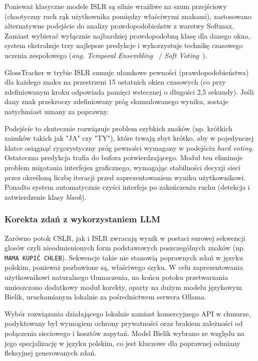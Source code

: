 \documentclass[12pt]{article}
\begin{document}
Ponieważ klasyczne modele ISLR są silnie wrażliwe na szum przejściowy (chaotyczny ruch rąk użytkownika pomiędzy właściwymi znakami), zastosowano alternatywne podejście do analizy prawdopodobieństw z warstwy Softmax. Zamiast wybierać wyłącznie najbardziej prawdopodobną klasę dla danego okna, system ekstrahuje trzy najlepsze predykcje i wykorzystuje technikę czasowego uczenia zespołowego (\textit{ang. Temporal Ensembling}~\cite{temporal-ensembling} / \textit{Soft Voting}~\cite{soft-voting}). 

GlossTracker w trybie ISLR sumuje ułamkowe pewności (prawdopodobieństwa) dla każdego znaku na przestrzeni 15 ostatnich okien czasowych (co przy zdefiniowanym kroku odpowiada pamięci wstecznej o długości 2,5 sekundy). Jeśli dany znak przekroczy zdefiniowany próg skumulowanego wyniku, zostaje natychmiast uznany za poprawny.

Podejście to skutecznie rozwiązuje problem szybkich znaków (np. krótkich zaimków takich jak "JA" czy "TY"), które trwają zbyt krótko, aby w pojedynczej klatce osiągnąć rygorystyczny próg pewności wymagany w podejściu \textit{hard voting}. Ostateczna predykcja trafia do bufora potwierdzającego. Moduł ten eliminuje problem migotania interfejsu graficznego, wymagając stabilności decyzji sieci przez określoną liczbę iteracji przed zaprezentowaniem wyniku użytkownikowi. Ponadto system automatycznie czyści interfejs po zakończeniu ruchu (detekcja i zatwierdzenie klasy \textit{blank}).

\subsubsection{Korekta zdań z wykorzystaniem LLM}

Zarówno potok CSLR, jak i ISLR zwracają wynik w postaci surowej sekwencji glosów czyli nieodmienionych form podstawowych poszczególnych znaków (np. \texttt{MAMA KUPIĆ CHLEB}). Sekwencje takie nie stanowią poprawnych zdań w języku polskim, ponieważ pozbawione są, właściwego szyku. W celu zaprezentowania użytkownikowi naturalnego tłumaczenia, na końcu potoku przetwarzania umieszczono dodatkowy moduł korekty, oparty na dużym modelu językowym Bielik, uruchamianym lokalnie za pośrednictwem serwera Ollama.

Wybór rozwiązania działającego lokalnie zamiast komercyjnego API w chmurze, podyktowany był wymogiem ochrony prywatności oraz brakiem zależności od połączenia sieciowego i kosztów zapytań. Model Bielik wybrano ze względu na jego specjalizację w języku polskim, co jest kluczowe dla poprawnej odmiany fleksyjnej generowanych zdań.
\end{document}
